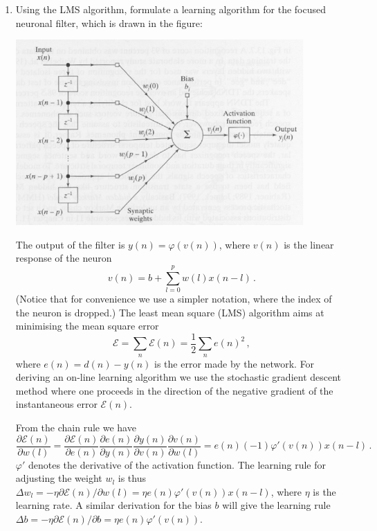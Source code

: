 \begin{enumerate}
\begin{solution}
  \end{solution}
  

\item Using the LMS algorithm, formulate a learning algorithm for the
  focused neuronal filter, which is drawn in the figure:
    \begin{center}
      \includegraphics[width=11cm]{l12k3a}
    \end{center}


  \begin{solution}

    The output of the filter is $y(n) =
    \varphi(v(n))$, where $v(n)$ is the linear response of the neuron $$v(n) = b +
    \sum_{l=0}^p w(l) x(n-l) \, .$$ (Notice that for convenience we use
    a simpler notation, where the index of the neuron is dropped.)
    The least mean square (LMS) algorithm aims at minimising the mean
    square error $$\mathcal{E} = \sum_n \mathcal{E}(n) = \frac{1}{2} \sum_n e(n)^2 \, ,$$
    where $e(n) = d(n) - y(n)$ is the error made by the network.  For deriving an
    on-line learning algorithm we  use the stochastic
    gradient descent method where one proceeds in the direction of the negative
    gradient of the instantaneous
    error $\mathcal{E}(n)$.

    From the chain rule we have $$\frac{\partial \mathcal{E}(n)}{\partial w(l)} =
    \frac{\partial \mathcal{E}(n)}{\partial e(n)} \frac{\partial e(n)}{\partial
      y(n)} \frac{\partial y(n)}{\partial v(n)} \frac{\partial
      v(n)}{\partial w(l)} = e(n) (-1) \varphi'(v(n)) x(n-l) \, .$$ 
    $\varphi'$ denotes the derivative of the activation function.
    The
    learning rule for adjusting the weight $w_l$ is thus $\Delta w_l = -\eta \partial \mathcal{E}(n) / \partial
    w(l) = \eta e(n) \varphi'(v(n)) x(n-l)$, where $\eta$ is the learning
    rate.  A similar derivation for the bias $b$ will give the learning
    rule $\Delta b = - \eta \partial \mathcal{E}(n) / \partial b = \eta e(n)
    \varphi'(v(n))$.


\end{solution}
\end{enumerate}
